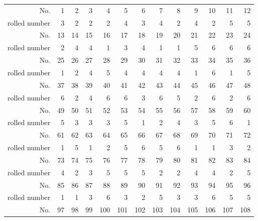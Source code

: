 \documentclass{scrreprt}
\begin{document}
\begin{table}[H]
  \centering
    \begin{tabular}{r||rrrrrrrrrrrr}
    No.   & 1     & 2     & 3     & 4     & 5     & 6     & 7     & 8     & 9     & 10    & 11    & 12 \\
    rolled number & 3     & 2     & 2     & 2     & 4     & 3     & 4     & 2     & 4     & 2     & 5     & 5 \\ \hline
    No.   & 13    & 14    & 15    & 16    & 17    & 18    & 19    & 20    & 21    & 22    & 23    & 24 \\
    rolled number & 2     & 4     & 4     & 1     & 3     & 4     & 1     & 1     & 5     & 6     & 6     & 6 \\ \hline
    No.   & 25    & 26    & 27    & 28    & 29    & 30    & 31    & 32    & 33    & 34    & 35    & 36 \\
    rolled number & 1     & 2     & 4     & 5     & 4     & 4     & 4     & 4     & 1     & 6     & 1     & 5 \\ \hline
    No.   & 37    & 38    & 39    & 40    & 41    & 42    & 43    & 44    & 45    & 46    & 47    & 48 \\
    rolled number & 6     & 2     & 4     & 6     & 6     & 3     & 6     & 5     & 2     & 6     & 2     & 6 \\ \hline
    No.   & 49    & 50    & 51    & 52    & 53    & 54    & 55    & 56    & 57    & 58    & 59    & 60 \\
    rolled number & 5     & 3     & 3     & 3     & 5     & 1     & 2     & 4     & 3     & 5     & 6     & 1 \\ \hline
    No.   & 61    & 62    & 63    & 64    & 65    & 66    & 67    & 68    & 69    & 70    & 71    & 72 \\
    rolled number & 1     & 5     & 1     & 2     & 5     & 6     & 5     & 6     & 1     & 1     & 3     & 2 \\ \hline
    No.   & 73    & 74    & 75    & 76    & 77    & 78    & 79    & 80    & 81    & 82    & 83    & 84 \\
    rolled number & 4     & 2     & 3     & 5     & 5     & 5     & 2     & 2     & 4     & 4     & 2     & 5 \\ \hline
    No.   & 85    & 86    & 87    & 88    & 89    & 90    & 91    & 92    & 93    & 94    & 95    & 96 \\
    rolled number & 1     & 1     & 3     & 6     & 3     & 2     & 5     & 3     & 3     & 6     & 5     & 5 \\ \hline
    No.   & 97    & 98    & 99    & 100   & 101   & 102   & 103   & 104   & 105   & 106   & 107   & 108 \\

\end{tabular}
\end{table}
\end{document}
